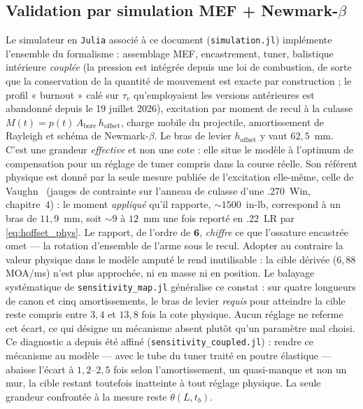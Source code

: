 \documentclass[12pt,a4paper]{article}
\begin{document}
	\subsection{Validation par simulation MEF + Newmark-$\beta$}
	\label{sec:validation_num}

	Le simulateur en \texttt{Julia} associé à ce document (\texttt{simulation.jl}) implémente l'ensemble du formalisme : assemblage MEF, encastrement, tuner, balistique intérieure \emph{couplée} (la pression est intégrée depuis une loi de combustion, de sorte que la conservation de la quantité de mouvement est exacte par construction ; le profil « burnout » calé sur $\tau_v$ qu'employaient les versions antérieures est abandonné depuis le 19 juillet 2026), excitation par moment de recul à la culasse $M(t) = p(t)\,A_\text{bore}\,h_\text{offset}$, charge mobile du projectile, amortissement de Rayleigh et schéma de Newmark-$\beta$. Le bras de levier $h_\text{offset}$ y vaut $62{,}5$~mm. C'est une grandeur \emph{effective} et non une cote : elle situe le modèle à l'optimum de compensation pour un réglage de tuner compris dans la course réelle. Son référent physique est donné par la seule mesure publiée de l'excitation elle-même, celle de Vaughn~\cite{Vaughn} (jauges de contrainte sur l'anneau de culasse d'une .270~Win, chapitre~4) : le moment \emph{appliqué} qu'il rapporte, $\sim 1500$~in-lb, correspond à un bras de $11{,}9$~mm, soit $\sim 9$ à $12$~mm une fois reporté en .22~LR par \eqref{eq:hoffset_phys}. Le rapport, de l'ordre de $\mathbf{6}$, \emph{chiffre} ce que l'ossature encastrée omet --- la rotation d'ensemble de l'arme sous le recul. Adopter au contraire la valeur physique dans le modèle amputé le rend inutilisable : la cible dérivée ($6{,}88$ MOA/ms) n'est plus approchée, ni en masse ni en position. Le balayage systématique de \texttt{sensitivity\_map.jl} généralise ce constat : sur quatre longueurs de canon et cinq amortissements, le bras de levier \emph{requis} pour atteindre la cible reste compris entre $3{,}4$ et $13{,}8$ fois la cote physique. Aucun réglage ne referme cet écart, ce qui désigne un mécanisme absent plutôt qu'un paramètre mal choisi. Ce diagnostic a depuis été affiné (\texttt{sensitivity\_coupled.jl}) : rendre ce mécanisme au modèle --- avec le tube du tuner traité en poutre élastique --- abaisse l'écart à $1{,}2$--$2{,}5$ fois selon l'amortissement, un quasi-manque et non un mur, la cible restant toutefois inatteinte à tout réglage physique. La seule grandeur confrontée à la mesure reste $\dot\theta(L,t_b)$.
\end{document}
